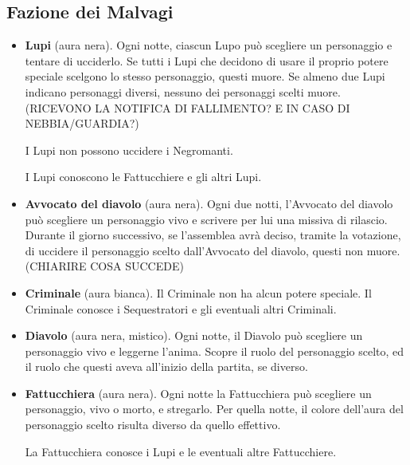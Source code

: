 \documentclass[a4paper,10pt]{article}
\begin{document}
\subsection*{Fazione dei Malvagi}

\begin{itemize}
 \item {\bf Lupi} (aura nera). Ogni notte, ciascun Lupo può scegliere un personaggio e tentare di ucciderlo.
 Se tutti i Lupi che decidono di usare il proprio potere speciale scelgono lo stesso personaggio, questi muore.
 Se almeno due Lupi indicano personaggi diversi, nessuno dei personaggi scelti muore. (RICEVONO LA NOTIFICA DI FALLIMENTO? E IN CASO DI NEBBIA/GUARDIA?)
 
 I Lupi non possono uccidere i Negromanti.
 
 I Lupi conoscono le Fattucchiere e gli altri Lupi.

 \item {\bf Avvocato del diavolo} (aura nera). Ogni due notti, l'Avvocato del diavolo può scegliere un personaggio vivo e scrivere per lui una missiva di rilascio.
 Durante il giorno successivo, se l'assemblea avrà deciso, tramite la votazione, di uccidere il personaggio scelto dall'Avvocato del diavolo, questi non muore. (CHIARIRE COSA SUCCEDE)

 \item {\bf Criminale} (aura bianca). Il Criminale non ha alcun potere speciale. Il Criminale conosce i Sequestratori e gli eventuali altri Criminali.

 \item {\bf Diavolo} (aura nera, mistico). Ogni notte, il Diavolo può scegliere un personaggio vivo e leggerne l'anima. Scopre il ruolo del personaggio scelto, ed il ruolo che questi aveva all'inizio della partita, se diverso.
 
 \item {\bf Fattucchiera} (aura nera). Ogni notte la Fattucchiera può scegliere un personaggio, vivo o morto, e stregarlo. Per quella notte, il colore dell'aura del personaggio scelto risulta diverso da quello effettivo.
 
 La Fattucchiera conosce i Lupi e le eventuali altre Fattucchiere.
 

\end{itemize}
\end{document}
